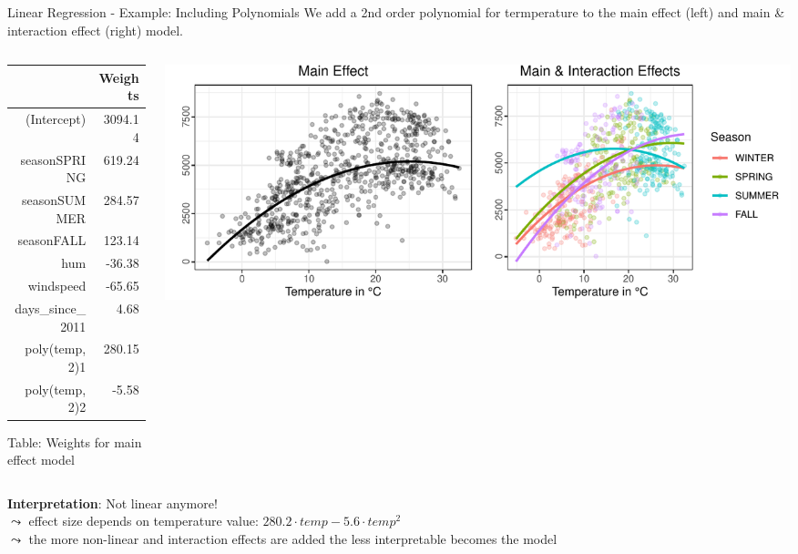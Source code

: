 \documentclass[11pt,compress,t,notes=noshow, aspectratio=169, xcolor=table]{beamer}
\begin{document}
\begin{frame}{Linear Regression - Example: Including Polynomials}
We add a 2nd order polynomial for termperature to the main effect (left) and main \& interaction effect (right) model.
\begin{columns}[T]
\begin{column}{0.25\textwidth}
\begin{tiny}
\begin{table}[ht]
\centering
\begin{tabular}{rr}
  \hline
 & Weights \\ 
  \hline
(Intercept) & 3094.14 \\ 
  seasonSPRING & 619.24 \\ 
  seasonSUMMER & 284.57 \\ 
  seasonFALL & 123.14 \\ 
  hum & -36.38 \\ 
  windspeed & -65.65 \\ 
  days\_since\_2011 & 4.68 \\ 
  poly(temp, 2)1 & 280.15 \\ 
  poly(temp, 2)2 & -5.58 \\ 
   \hline
\end{tabular}
\end{table}
   Table: Weights for main effect model

\end{tiny}

\end{column}
\begin{column}{0.7\textwidth}
\includegraphics[width = \textwidth]{slides/interpretable-models/figure/poly_main_vs_interaction_effects.pdf}
\end{column}
\end{columns}
\vfill
\textbf{Interpretation}: Not linear anymore!\\ $\leadsto$ effect size depends on temperature value: $280.2 \cdot temp - 5.6 \cdot temp^2$\\
$\leadsto$ the more non-linear and interaction effects are added the less interpretable becomes the model
\end{frame}
\end{document}
